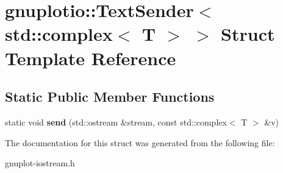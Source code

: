 \hypertarget{structgnuplotio_1_1TextSender_3_01std_1_1complex_3_01T_01_4_01_4}{}\section{gnuplotio\+:\+:Text\+Sender$<$ std\+:\+:complex$<$ T $>$ $>$ Struct Template Reference}
\label{structgnuplotio_1_1TextSender_3_01std_1_1complex_3_01T_01_4_01_4}
\subsection*{Static Public Member Functions}
\begin{DoxyCompactItemize}
\item 
\mbox{\label{structgnuplotio_1_1TextSender_3_01std_1_1complex_3_01T_01_4_01_4_ad524aa3e121d0ebd66346d77f1fd5a1c}} 
static void {\bfseries send} (std\+::ostream \&stream, const std\+::complex$<$ T $>$ \&v)
\end{DoxyCompactItemize}


The documentation for this struct was generated from the following file\+:\begin{DoxyCompactItemize}
\item 
gnuplot-\/iostream.\+h\end{DoxyCompactItemize}
